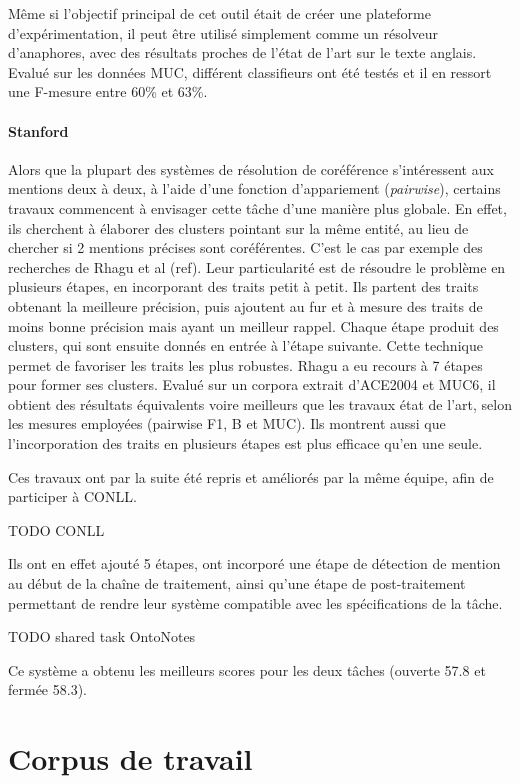 \documentclass[a4paper,12pt]{article}
\begin{document}
Même si l'objectif principal de cet outil était de créer une plateforme d'expérimentation, il peut être utilisé simplement comme un résolveur d'anaphores, avec des résultats proches de l'état de l'art sur le texte anglais. Evalué sur les données MUC, différent classifieurs ont été testés et il en ressort une F-mesure entre 60\% et 63\%.

\paragraph{Stanford}
Alors que la plupart des systèmes de résolution de coréférence  s'intéressent aux mentions deux à deux, à l'aide d'une fonction d'\og appariement \fg{} (\textit{pairwise}), certains travaux commencent à envisager cette tâche d'une manière plus globale. En effet, ils cherchent à élaborer des clusters pointant sur la même entité, au lieu de chercher si 2 mentions précises sont coréférentes. C'est le cas par exemple des recherches de Rhagu et al (ref). Leur particularité est de résoudre le problème en plusieurs étapes, en incorporant des traits petit à petit. Ils partent des traits obtenant la meilleure précision, puis ajoutent au fur et à mesure des traits de moins bonne précision mais ayant un meilleur rappel. Chaque étape produit des clusters, qui sont ensuite donnés en entrée à l'étape suivante. Cette technique permet de favoriser les traits les plus robustes.
Rhagu a eu recours à 7 étapes pour former ses clusters. Evalué sur un corpora extrait d'ACE2004 et MUC6, il obtient des résultats équivalents voire meilleurs que les travaux état de l'art, selon les mesures employées (pairwise F1, B et MUC). Ils montrent aussi que l'incorporation des traits en plusieurs étapes est plus efficace qu'en une seule.

Ces travaux ont par la suite été repris et améliorés par la même équipe, afin de participer à CONLL.

TODO CONLL

Ils ont en effet ajouté 5 étapes, ont incorporé une étape de détection de mention au début de la chaîne de traitement, ainsi qu'une étape de post-traitement permettant de rendre leur système compatible avec les spécifications de la tâche.

TODO shared task OntoNotes

Ce système a obtenu les meilleurs scores pour les deux tâches (ouverte 57.8 et fermée 58.3).

\section{Corpus de travail}
\label{corpus}
\end{document}
